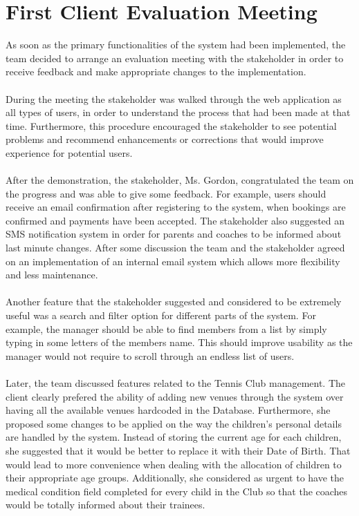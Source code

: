 \documentclass{l3proj}
\begin{document}
\section{First Client Evaluation Meeting}
As soon as the primary functionalities of the system had been implemented, the team decided to arrange an evaluation meeting with the stakeholder in order to receive feedback and make appropriate changes to the implementation.\\
\\During the meeting the stakeholder was walked through the web application as all types of users, in order to understand the process that had been made at that time. Furthermore, this procedure encouraged the stakeholder to see potential problems and recommend enhancements or corrections that would improve experience for potential users.\\
\\After the demonstration, the stakeholder, Ms. Gordon, congratulated the team on the progress and was able to give some feedback. For example, users should receive an email confirmation after registering to the system, when bookings are confirmed and payments have been accepted. The stakeholder also suggested an SMS notification system in order for parents and coaches to be informed about last minute changes. After some discussion the team and the stakeholder agreed on an implementation of an internal email system which allows more flexibility and less maintenance.\\
\\
Another feature that the stakeholder suggested and considered to be extremely useful was a search and filter option for different parts of the system. For example, the manager should be able to find members from a list by simply typing in some letters of the members name. This should improve usability as the manager would not require to scroll through an endless list of users.\\
\\
Later, the team discussed features related to the Tennis Club management. The client clearly prefered the ability of adding new venues through the system over having all the available venues hardcoded in the Database. Furthermore, she proposed some changes to be applied on the way the children's personal details are handled by the system. Instead of storing the current age for each children, she suggested that it would be better to replace it with their Date of Birth. That would lead to more convenience when dealing with the allocation of children to their appropriate age groups. Additionally, she considered as urgent to have the medical condition field completed for every child in the Club so that the coaches would be totally informed about their trainees.\\
\end{document}
